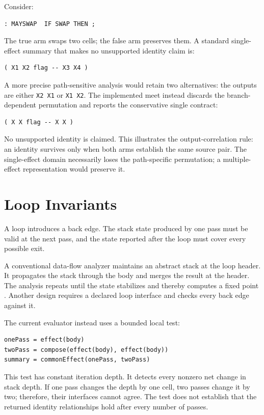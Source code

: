 \documentclass[11pt,a4paper]{article}
\begin{document}
Consider:

\begin{lstlisting}
: MAYSWAP  IF SWAP THEN ;
\end{lstlisting}

The true arm swaps two cells; the false arm preserves them.  A standard
single-effect summary that makes no unsupported identity claim is:

\begin{lstlisting}
( X1 X2 flag -- X3 X4 )
\end{lstlisting}

A more precise path-sensitive analysis would retain two alternatives: the
outputs are either \texttt{X2 X1} or \texttt{X1 X2}.  The implemented meet
instead discards the branch-dependent permutation and reports the conservative
single contract:

\begin{lstlisting}
( X X flag -- X X )
\end{lstlisting}

No unsupported identity is claimed.  This illustrates the output-correlation
rule: an identity survives only when both arms establish the same source pair.
The single-effect domain necessarily loses the path-specific permutation; a
multiple-effect representation would preserve it.

\section{Loop Invariants}
\label{sec:loops}

A loop introduces a back edge.  The stack state produced by one pass must be
valid at the next pass, and the state reported after the loop must cover every
possible exit.

A conventional data-flow analyzer maintains an abstract stack at the loop
header.  It propagates the stack through the body and merges the result at the
header.  The analysis repeats until the state stabilizes and thereby computes
a fixed point \cite{cousot1977}.  Another design requires a declared loop
interface and checks every back edge against it.

The current evaluator instead uses a bounded local test:

\begin{lstlisting}
onePass = effect(body)
twoPass = compose(effect(body), effect(body))
summary = commonEffect(onePass, twoPass)
\end{lstlisting}

This test has constant iteration depth.  It detects every nonzero net change in
stack depth.  If one pass changes the depth by one cell, two passes change it
by two; therefore, their interfaces cannot agree.  The test does not establish
that the returned identity relationships hold after every number of passes.
\end{document}
